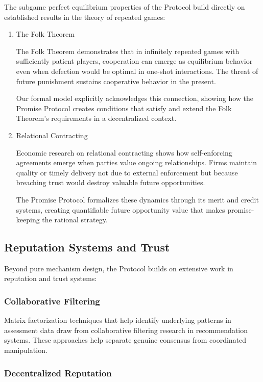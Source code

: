 \documentclass[11pt]{article}
\begin{document}
The subgame perfect equilibrium properties of the Protocol build directly on established results in the theory of repeated games:
\begin{enumerate}
\item The Folk Theorem
\label{sec:org945a9e9}

The Folk Theorem demonstrates that in infinitely repeated games with sufficiently patient players, cooperation can emerge as equilibrium behavior even when defection would be optimal in one-shot interactions. The threat of future punishment sustains cooperative behavior in the present.

Our formal model explicitly acknowledges this connection, showing how the Promise Protocol creates conditions that satisfy and extend the Folk Theorem's requirements in a decentralized context.
\item Relational Contracting
\label{sec:org16f6dec}

Economic research on relational contracting shows how self-enforcing agreements emerge when parties value ongoing relationships. Firms maintain quality or timely delivery not due to external enforcement but because breaching trust would destroy valuable future opportunities.

The Promise Protocol formalizes these dynamics through its merit and credit systems, creating quantifiable future opportunity value that makes promise-keeping the rational strategy.
\end{enumerate}
\subsection{Reputation Systems and Trust}
\label{sec:org153ee4a}

Beyond pure mechanism design, the Protocol builds on extensive work in reputation and trust systems:
\subsubsection{Collaborative Filtering}
\label{sec:org492bbe3}

Matrix factorization techniques that help identify underlying patterns in assessment data draw from collaborative filtering research in recommendation systems. These approaches help separate genuine consensus from coordinated manipulation.
\subsubsection{Decentralized Reputation}
\label{sec:org01299a3}
\end{document}

